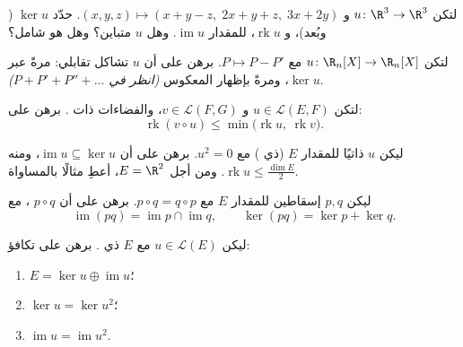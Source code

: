 \begin{exercise}[$\star$]\label{exo:b1:linmaps:2}
لتكن $u \colon \R^3 \to \R^3$ و $(x,y,z) \mapsto (x + y - z,\; 2x + y
+ z,\; 3x + 2y)$. حدّد $\ker u$ ( وبُعد)، و
$\operatorname{rk} u$،  للمقدار $\operatorname{im} u$. وهل $u$
متباين؟ وهل هو شامل؟
\end{exercise}

\begin{exercise}[$\star$]\label{exo:b1:linmaps:3}
لتكن $u \colon \R_n[X] \to \R_n[X]$ مع $P \mapsto P - P'$. برهن على أن
$u$ تشاكل تقابلي: مرةً عبر $\ker u$، ومرةً بإظهار
المعكوس \emph{(انظر في $P + P' + P'' + \dots$)}.
\end{exercise}

\begin{exercise}[$\star$]\label{exo:b1:linmaps:4}
لتكن $u \in \mathcal{L}(E, F)$ و $v \in \mathcal{L}(F, G)$، والفضاءات
ذات . برهن على:
\[
\operatorname{rk}(v \circ u) \leq
\min\bigl(\operatorname{rk} u,\ \operatorname{rk} v\bigr).
\]
\end{exercise}

\begin{exercise}[$\star\star$]\label{exo:b1:linmaps:5}
ليكن $u$  ذاتيًا للمقدار $E$ (ذي ) مع $u^2 =
0$. برهن على أن $\operatorname{im} u \subseteq \ker u$، ومنه
$\operatorname{rk} u \leq \frac{\dim E}{2}$. ومن أجل $E = \R^2$، أعطِ
مثالًا بالمساواة.
\end{exercise}

\begin{exercise}[$\star\star$]\label{exo:b1:linmaps:6}
ليكن $p, q$ إسقاطين للمقدار $E$ مع $p \circ q = q \circ p$.
برهن على أن $p \circ q$ ، مع
\[
\operatorname{im}(pq) = \operatorname{im} p \cap \operatorname{im}
q ,
\qquad
\ker (pq) = \ker p + \ker q .
\]
\end{exercise}

\begin{exercise}[$\star\star$]\label{exo:b1:linmaps:7}
ليكن $u \in \mathcal{L}(E)$ مع $E$ ذي . برهن على
تكافؤ:
\begin{enumerate}
  \item $E = \ker u \oplus \operatorname{im} u$؛
  \item $\ker u = \ker u^2$؛
  \item $\operatorname{im} u = \operatorname{im} u^2$.
\end{enumerate}
\end{exercise}

